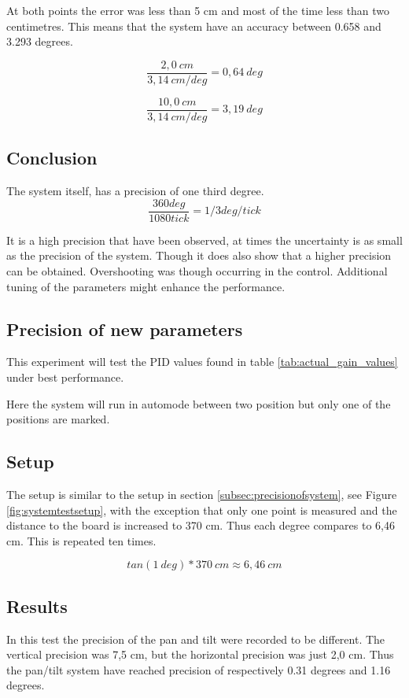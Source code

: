 At both points the error was less than 5 cm and most of the time
less than two centimetres. This means that the system have an accuracy between 0.658 and
3.293 degrees.

\[ \frac{2,0 \ cm}{3,14\ cm/deg} = 0,64 \ deg \]

\[ \frac{10,0 \ cm}{3,14 \ cm/deg} = 3,19 \ deg \]

\subsection*{Conclusion}

The system itself, has a precision of one third degree.
\[ \frac{360 deg}{1080 tick} = 1/3 deg/tick \]

It is a high precision that have been observed, at times the uncertainty is as
small as the precision of the system. Though it does also show that a higher
precision can be obtained. Overshooting was though occurring in the control.
Additional tuning of the parameters might enhance the performance.

\subsection{Precision of new parameters}\label{sec:precisionofsystem2}

This experiment will test the PID values found in table \ref{tab:actual_gain_values}
under best performance.

Here the system will run in automode between two position but only one of the
positions are marked. 

\subsection*{Setup}

The setup is similar to the setup in section \ref{subsec:precisionofsystem}, see
Figure \ref{fig:systemtestsetup}, with the exception that only one point is measured and the distance to the board is increased to 370 cm. Thus each degree compares to 6,46 cm. This is repeated ten times.

\[ tan(1 \ deg) * 370 \ cm \approx 6,46 \ cm \]

\subsection*{Results}

In this test the precision of the pan and tilt were recorded to be different. The vertical precision was 7,5 cm, but the horizontal precision was just 2,0 cm. Thus the pan/tilt system have
reached precision of respectively 0.31 degrees and 1.16 degrees.


